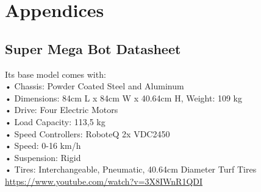 \chapter*{Appendices}
\clearpage
{}
\section{Super Mega Bot Datasheet}
\label{AppA}

\begin{figure}[h]
	\begin{center} 
		\qquad
	\end{center}
\end{figure}

Its base model comes with:\\
•	Chassis: Powder Coated Steel and Aluminum \\
•	Dimensions: 84cm L x 84cm W x 40.64cm H, Weight: 109 kg\\
•	Drive: Four Electric Motors\\
•	Load Capacity: 113,5 kg\\
•	Speed Controllers: RoboteQ 2x VDC2450\\
•	Speed: 0-16 km/h \\
•	Suspension: Rigid\\
•	Tires: Interchangeable, Pneumatic, 40.64cm Diameter Turf Tires\\
\url{https://www.youtube.com/watch?v=3X8IWnR1QDI}





\label{AppB}

